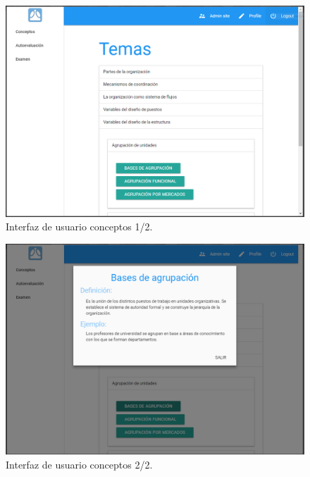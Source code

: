 \begin{figure}[!ht]
  \begin{center}
    \includegraphics[width=1\textwidth]{../images/interfaz_conceptos1.png}
    \caption{Interfaz de usuario conceptos 1/2.}
    \label{fig:interfaz_conceptos1}
  \end{center}
\end{figure}



\begin{figure}[!ht]
  \begin{center}
    \includegraphics[width=1\textwidth]{../images/interfaz_conceptos2.png}
    \caption{Interfaz de usuario conceptos 2/2.}
    \label{fig:interfaz_conceptos2}
  \end{center}
\end{figure}


